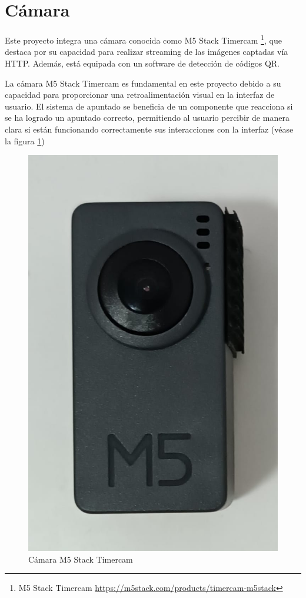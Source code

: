 \section{Cámara}
\label{section:camara}

Este proyecto integra una cámara conocida como M5 Stack Timercam \footnote{M5 Stack Timercam \url{https://m5stack.com/products/timercam-m5stack}}, que destaca por su capacidad para realizar streaming de las imágenes captadas vía HTTP. Además, está equipada con un software de detección de códigos QR.

La cámara M5 Stack Timercam es fundamental en este proyecto debido a su capacidad para proporcionar una retroalimentación visual en la interfaz de usuario. El sistema de apuntado se beneficia de un componente que reacciona si se ha logrado un apuntado correcto, permitiendo al usuario percibir de manera clara si están funcionando correctamente sus interacciones con la interfaz (véase la figura \ref{figure:camera})

\begin{figure}[!htb]
   \centering
    \includegraphics[width=0.25\linewidth]{figures/camera.jpg}
   \caption{Cámara M5 Stack Timercam}
   \label{figure:camera}
\end{figure}

